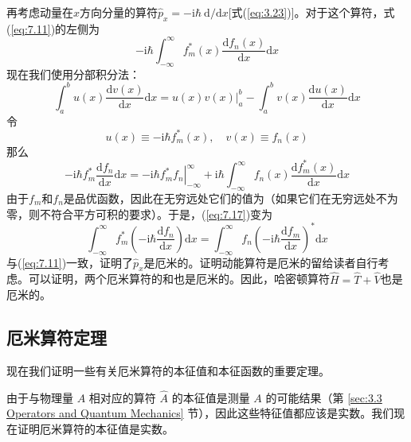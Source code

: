     再考虑动量在$x$方向分量的算符$\hat{p}_x = -\mathrm{i}\hbar \: \mathrm{d}/\mathrm{d}x$[式(\ref{eq:3.23})]。对于这个算符，式(\ref{eq:7.11})的左侧为
    \begin{equation*}
        -\mathrm{i}\hbar \int_{-\infty}^{\infty} f_m^{\ast}\left(x\right)\frac{\mathrm{d}f_n\left(x\right)}{\mathrm{d}x} \mathrm{d}x
    \end{equation*}
    现在我们使用分部积分法：
    \begin{equation}
        \int_{a}^{b}u\left(x\right)\frac{\mathrm{d}v\left(x\right)}{\mathrm{d}x}\mathrm{d}x = \left. u\left(x\right)v\left(x\right)\right|_{a}^{b} - \int_{a}^{b}v\left(x\right)\frac{\mathrm{d}u\left(x\right)}{\mathrm{d}x}\mathrm{d}x
        \label{eq:7.16}
    \end{equation}
    令
    \begin{equation*}
        u\left(x\right) \equiv -\mathrm{i}\hbar f_m^{\ast}\left(x\right), \quad v\left(x\right) \equiv f_n\left(x\right)
    \end{equation*}
    那么
    \begin{equation}
        -\mathrm{i}\hbar f_m^{\ast}\frac{\mathrm{d}f_n}{\mathrm{d}x}\mathrm{d}x = \left. -\mathrm{i}\hbar f_m^{\ast}f_n\right|_{-\infty}^{\infty} + \mathrm{i}\hbar \int_{-\infty}^{\infty} f_n\left(x\right)\frac{\mathrm{d}f_m^{\ast}\left(x\right)}{\mathrm{d}x}\mathrm{d}x
        \label{eq:7.17}
    \end{equation}
    由于$f_m$和$f_n$是品优函数，因此在无穷远处它们的值为（如果它们在无穷远处不为零，则不符合平方可积的要求）。于是，(\ref{eq:7.17})变为
    \begin{equation*}
        \int_{-\infty}^{\infty} f_m^{\ast}\left(-\mathrm{i}\hbar \frac{\mathrm{d}f_n}{\mathrm{d}x}\right)\mathrm{d}x = \int_{-\infty}^{\infty} f_n\left(-\mathrm{i}\hbar \frac{\mathrm{d}f_m}{\mathrm{d}x}\right)^{\ast}\mathrm{d}x
    \end{equation*}
    与(\ref{eq:7.11})一致，证明了$\hat{p}_x$是厄米的。证明动能算符是厄米的留给读者自行考虑。可以证明，两个厄米算符的和也是厄米的。因此，哈密顿算符$\hat{H} = \hat{T} + \hat{V}$也是厄米的。

\subsection*{厄米算符定理}

    现在我们证明一些有关厄米算符的本征值和本征函数的重要定理。

    由于与物理量 $A$ 相对应的算符 $\hat{A}$ 的本征值是测量 $A$ 的可能结果（第 \ref{sec:3.3 Operators and Quantum Mechanics} 节），因此这些特征值都应该是实数。我们现在证明厄米算符的本征值是实数。

